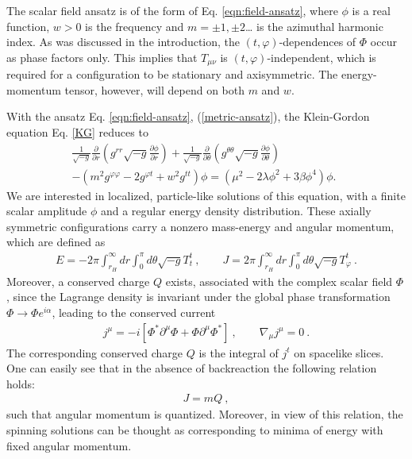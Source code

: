 The scalar field ansatz is of the form of Eq. \eqref{eqn:field-ansatz}, 
 where $\phi$ is a real function, $w>0$ is the frequency and $m=\pm 1,\pm 2$\dots
is the azimuthal harmonic index. 
As was discussed in the introduction, the $(t, \varphi)$-dependences of $\Phi$ occur as phase factors only.
This implies that $T_{\mu\nu}$ is $(t, \varphi)$-independent, which is required for
a configuration to be stationary and axisymmetric.
The energy-momentum tensor, however,  will 
 depend on both $m$ and $w$.

With the ansatz Eq. \eqref{eqn:field-ansatz}, (\ref{metric-ansatz}), 
the Klein-Gordon equation Eq. \eqref{KG}
reduces to
\begin{eqnarray}
\label{KG1}
\frac{1}{\sqrt{-g}}\frac{\partial}{\partial r}\left(g^{rr}\sqrt{-g}\frac{\partial \phi}{\partial r} \right)+
\frac{1}{\sqrt{-g}}\frac{\partial}{\partial \theta} \left(g^{\theta \theta}\sqrt{-g}\frac{\partial \phi}{\partial \theta} \right)
\nonumber\\
-\left(
m^2 g^{\varphi \varphi}-2g^{\varphi t} +w^2 g^{tt} 
\right)\phi
=(\mu^2-2 \lambda \phi^2+3\beta \phi^4)\phi.~{~}
\end{eqnarray}
We are interested in 
localized, particle-like solutions of this equation,
 with a finite scalar amplitude $\phi$ and a regular energy density distribution.
These axially symmetric configurations carry a nonzero 
  mass-energy and angular momentum,  which are defined as
\begin{eqnarray}
\label{scalar-charges}
E=-2\pi \int_{r_H}^\infty dr \int_0^\pi d\theta \sqrt{-g}T_t^t\ , \qquad 
J= 2\pi \int_{r_H}^\infty dr \int_0^\pi d\theta \sqrt{-g}T_\varphi^t \ .
 \end{eqnarray}
%
Moreover, a conserved charge $Q$ exists, associated with the complex scalar field $\Phi$, since the Lagrange density is invariant under the global phase transformation
$\Phi \to \Phi e^{i\alpha}$, 
 leading to the conserved current
 \begin{eqnarray}
\label{scalar-current}
j^{\mu}=-i\left[\Phi^* \partial^\mu\Phi+\Phi \partial^\mu\Phi^*\right]\ , \qquad \nabla_\mu j^{\mu}=0 \ .
 \end{eqnarray}
The corresponding conserved charge $Q$ is the integral of $j^t$ on spacelike slices.
One can easily see that in the absence of backreaction the following relation holds:
 \begin{eqnarray}
\label{rel1}
J=m Q\ ,
\end{eqnarray}
such that  angular momentum  is quantized.
Moreover,
in view of this relation, the spinning solutions
can be thought as corresponding to minima of energy with fixed angular
momentum.
 
